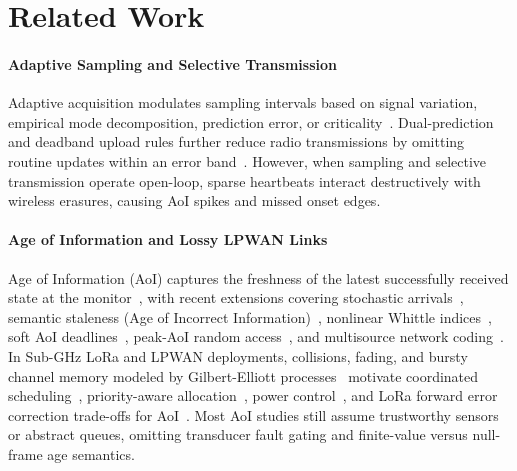 \documentclass[journal,twoside,web]{ieeecolor}
\begin{document}
\section{Related Work}
\paragraph{Adaptive Sampling and Selective Transmission}
Adaptive acquisition modulates sampling intervals based on signal variation, empirical mode decomposition, prediction error, or criticality~\cite{rao2019adaptive,masoum2012quality,algabroun2020dsra,wang2023emd}. Dual-prediction and deadband upload rules further reduce radio transmissions by omitting routine updates within an error band~\cite{dias2017dual,arnaiz2024energy}. However, when sampling and selective transmission operate open-loop, sparse heartbeats interact destructively with wireless erasures, causing AoI spikes and missed onset edges.

\paragraph{Age of Information and Lossy LPWAN Links}
Age of Information (AoI) captures the freshness of the latest successfully received state at the monitor~\cite{kaul2012realtime,yates2021age,kahraman2024survey}, with recent extensions covering stochastic arrivals~\cite{kadota2021minimizing}, semantic staleness (Age of Incorrect Information)~\cite{maatouk2020aoii}, nonlinear Whittle indices~\cite{tripathi2024whittle}, soft AoI deadlines~\cite{li2025soft}, peak-AoI random access~\cite{wu2024paoi}, and multisource network coding~\cite{kahraman2024coding}. In Sub-GHz LoRa and LPWAN deployments, collisions, fading, and bursty channel memory modeled by Gilbert-Elliott processes~\cite{gilbert1960capacity,augustin2016lora} motivate coordinated scheduling~\cite{garridohidalgo2021lorawan}, priority-aware allocation~\cite{lima2021adaptive}, power control~\cite{algumaei2022lora}, and LoRa forward error correction trade-offs for AoI~\cite{chache2024lora}. Most AoI studies still assume trustworthy sensors or abstract queues, omitting transducer fault gating and finite-value versus null-frame age semantics.
\end{document}
